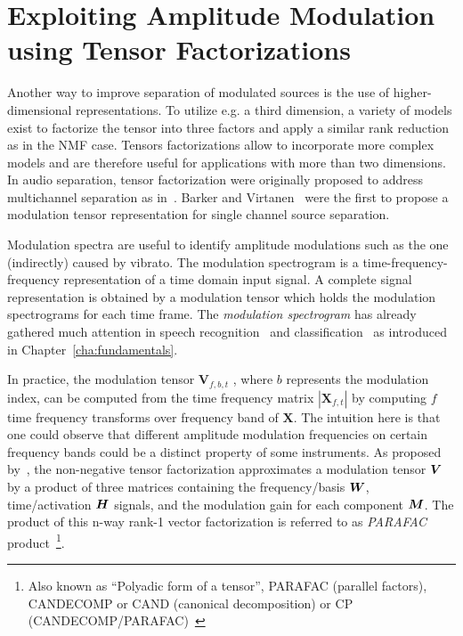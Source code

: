 \section{Exploiting Amplitude Modulation using Tensor Factorizations}
\label{sub:am}


Another way to improve separation of modulated sources is the use of higher-dimensional representations.
To utilize e.g. a third dimension, a variety of models exist to factorize the tensor into three factors and apply a similar rank reduction as in the NMF case.
Tensors factorizations allow to incorporate more complex models and are therefore useful for applications with more than two dimensions.
In audio separation, tensor factorization were originally proposed to address multichannel separation as in~\cite{fitzgerald08, fevotte10, ozerov11}. 
Barker and Virtanen~\cite{barker13} were the first to propose a modulation tensor representation for single channel source separation. 
\par
Modulation spectra are useful to identify amplitude modulations such as the one (indirectly) caused by vibrato. 
The modulation spectrogram is a time-frequency-frequency representation of a time domain input signal.
A complete signal representation is obtained by a modulation tensor which holds the modulation spectrograms for each time frame.
The \emph{modulation spectrogram} has already gathered much attention in speech recognition~\cite{greenberg97, kingsbury98} and classification~\cite{kinnunen08, markaki09} as introduced in Chapter~\ref{cha:fundamentals}.
\par
In practice, the modulation tensor \(\mathbf{V}_{f, b, t}\) , where \(b\) represents the modulation index, can be computed from the time frequency matrix \(| \mathbf{X}_{f, t} |\) by computing \(f\) time frequency transforms over frequency band of \(\mathbf{X}\).
The intuition here is that one could observe that different amplitude modulation frequencies on certain frequency bands could be a distinct property of some instruments.
As proposed by~\cite{barker13}, the non-negative tensor factorization approximates a modulation tensor \({\bm{V}}\) by a product of three matrices containing the frequency/basis \({\bm{W}}\), time/activation \({\bm{H}}\) signals, and the modulation gain for each component \({\bm{M}}\).
The product of this n-way rank-1 vector factorization is referred to as \emph{PARAFAC} product~\footnote{Also known as ``Polyadic form of a tensor'', PARAFAC (parallel factors), CANDECOMP or CAND (canonical decomposition) or CP (CANDECOMP/PARAFAC)~\cite{kolda09}}.

